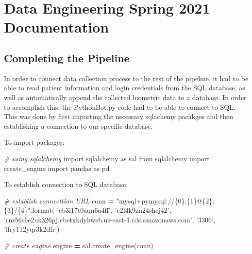 \documentclass[]{book}
\newenvironment{Shaded}{\begin{snugshade}}{\end{snugshade}}
\newcommand{\SpecialCharTok}[1]{\textcolor[rgb]{0.00,0.00,0.00}{#1}}
\newcommand{\StringTok}[1]{\textcolor[rgb]{0.31,0.60,0.02}{#1}}
\newcommand{\ImportTok}[1]{#1}
\newcommand{\CommentTok}[1]{\textcolor[rgb]{0.56,0.35,0.01}{\textit{#1}}}
\newcommand{\OperatorTok}[1]{\textcolor[rgb]{0.81,0.36,0.00}{\textbf{#1}}}
\newcommand{\BuiltInTok}[1]{#1}
\newcommand{\NormalTok}[1]{#1}
\begin{document}
\chapter{Data Engineering Spring 2021
Documentation}\label{data-engineering-spring-2021-documentation}

\section{Completing the Pipeline}\label{completing-the-pipeline}

In order to connect data collection process to the rest of the pipeline,
it had to be able to read patient information and login credentials from
the SQL database, as well as automatically append the collected
biometric data to a database. In order to accomplish this, the
PythonBot.py code had to be able to connect to SQL. This was done by
first importing the necessary sqlachemy pacakges and then establishing a
connection to our specific database.

To import packages:

\begin{Shaded}
\begin{Highlighting}[]
\CommentTok{# using sqlalchemy}
\ImportTok{import}\NormalTok{ sqlalchemy }\ImportTok{as}\NormalTok{ sal}
\ImportTok{from}\NormalTok{ sqlalchemy }\ImportTok{import}\NormalTok{ create_engine}
\ImportTok{import}\NormalTok{ pandas }\ImportTok{as}\NormalTok{ pd}
\end{Highlighting}
\end{Shaded}

To establish connection to SQL database:

\begin{Shaded}
\begin{Highlighting}[]
\CommentTok{# establish connecttion URL}
\NormalTok{conn }\OperatorTok{=} \StringTok{"mysql+pymysql://}\SpecialCharTok{\{0\}}\StringTok{:}\SpecialCharTok{\{1\}}\StringTok{@}\SpecialCharTok{\{2\}}\StringTok{:}\SpecialCharTok{\{3\}}\StringTok{/}\SpecialCharTok{\{4\}}\StringTok{"}\NormalTok{.}\BuiltInTok{format}\NormalTok{(}
    \StringTok{'cb3i17t0aqn6a4ff'}\NormalTok{, }\StringTok{'e2l4k9zn24shcj42'}\NormalTok{, }\StringTok{'rnr56s6e2uk326pj.cbetxkdyhwsb.us-east-1.rds.amazonaws.com'}\NormalTok{, }\StringTok{'3306'}\NormalTok{, }\StringTok{'lfry112yqr3k2dfr'}\NormalTok{)}
 
\CommentTok{# create engine}
\NormalTok{engine }\OperatorTok{=}\NormalTok{ sal.create_engine(conn)}
\end{Highlighting}
\end{Shaded}
\end{document}
